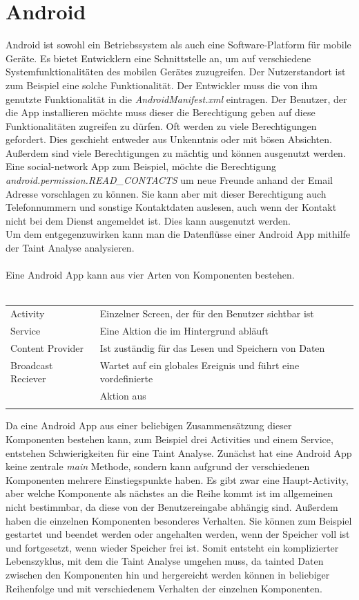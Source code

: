 \documentclass[runningheads]{llncs}
\begin{document}
\section{Android}\label{sec:android}
Android ist sowohl ein Betriebssystem als auch eine Software-Platform für mobile Geräte. Es bietet Entwicklern eine Schnittstelle an, um auf verschiedene Systemfunktionalitäten des mobilen Gerätes zuzugreifen. Der Nutzerstandort ist zum Beispiel eine solche Funktionalität. Der Entwickler muss die von ihm genutzte Funktionalität in die \emph{AndroidManifest.xml} eintragen. Der Benutzer, der die App installieren möchte muss dieser die Berechtigung geben auf diese Funktionalitäten zugreifen zu dürfen. Oft werden zu viele Berechtigungen gefordert. Dies geschieht entweder aus Unkenntnis oder mit bösen Absichten. Außerdem sind viele Berechtigungen zu mächtig und können ausgenutzt werden. Eine social-network App zum Beispiel, möchte die Berechtigung\\\emph{android.permission.READ\_CONTACTS} um neue Freunde anhand der Email Adresse vorschlagen zu können. Sie kann aber mit dieser Berechtigung auch Telefonnummern und sonstige Kontaktdaten auslesen, auch wenn der Kontakt nicht bei dem Dienst angemeldet ist. Dies kann ausgenutzt werden.\\
Um dem entgegenzuwirken kann man die Datenflüsse einer Android App mithilfe der Taint Analyse analysieren. \\\\
Eine Android App kann aus vier Arten von Komponenten bestehen.\\\\
\begin{tabular}{ll}
	Activity & Einzelner Screen, der für den Benutzer sichtbar ist\\
	Service & Eine Aktion die im Hintergrund abläuft\\
	Content Provider & Ist zuständig für das Lesen und Speichern von Daten\\
	Broadcast Reciever & Wartet auf ein globales Ereignis und führt eine vordefinierte \\
	& Aktion aus\\\\
\end{tabular}
Da eine Android App aus einer beliebigen Zusammensätzung dieser Komponenten bestehen kann, zum Beispiel drei Activities und einem Service, entstehen Schwierigkeiten für eine Taint Analyse. Zunächst hat eine Android App keine zentrale \emph{main} Methode, sondern kann aufgrund der verschiedenen Komponenten mehrere Einstiegspunkte haben. Es gibt zwar eine Haupt-Activity, aber welche Komponente als nächstes an die Reihe kommt ist im allgemeinen nicht bestimmbar, da diese von der Benutzereingabe abhängig sind. Außerdem haben die einzelnen Komponenten besonderes Verhalten. Sie können zum Beispiel gestartet und beendet werden oder angehalten werden, wenn der Speicher voll ist und fortgesetzt, wenn wieder Speicher frei ist. Somit entsteht ein komplizierter Lebenszyklus, mit dem die Taint Analyse umgehen muss, da tainted Daten zwischen den Komponenten hin und hergereicht werden können in beliebiger Reihenfolge und mit verschiedenem Verhalten der einzelnen Komponenten. 
\end{document}
